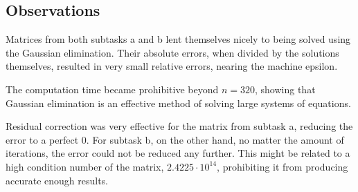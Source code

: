 \documentclass{article}
\begin{document}
	\subsection{Observations}
	
	Matrices from both subtasks a and b lent themselves nicely to being solved
	using the Gaussian elimination. Their absolute errors, when divided by the
	solutions themselves, resulted in very small relative errors, nearing the
	machine epsilon.
	
	The computation time became prohibitive beyond $n = 320$, showing that
	Gaussian elimination is an effective method of solving large systems
	of equations.
	
	Residual correction was very effective for the matrix from subtask a,
	reducing the error to a perfect $0$. For subtask b, on the other hand, no
	matter the amount of iterations, the error could not be reduced any further.
	This might be related to a high condition number of the matrix,
	$2.4225 \cdot 10^{14}$, prohibiting it from producing accurate enough
	results.
	
\end{document}
